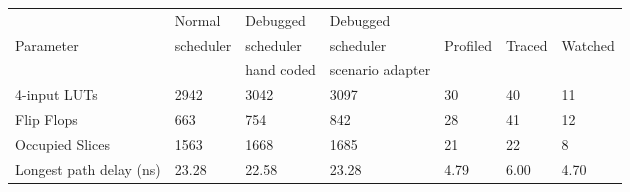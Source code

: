 
\begin{tabular}{|l||l|l|llll|}
\hline
          & Normal    & Debugged   & Debugged         &  &&\\
Parameter & scheduler & scheduler  & scheduler        & Profiled & Traced & Watched \\
          &           & hand coded & scenario adapter &  &&\\
\hline
4-input LUTs & 2942 & 3042 & 3097 & 30 & 40 & 11\\%
Flip Flops & 663 & 754 & 842 & 28 & 41 & 12\\%
Occupied Slices & 1563 & 1668 & 1685 & 21 & 22 & 8 \\%
Longest path delay (ns) & 23.28 & 22.58 & 23.28 & 4.79 & 6.00 & 4.70\\%
\hline
\end{tabular}
